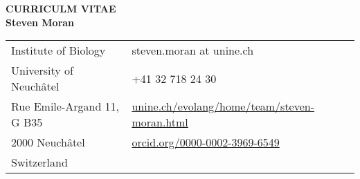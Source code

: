 \documentclass[11pt]{article}
\begin{document}
\pagestyle{empty}


\begin{center}
{\bf CURRICULM VITAE\\Steven Moran}\\

\vskip 12pt

\begin{tabular}{ll}
%


Institute of Biology   & steven.moran at unine.ch \\
University of Neuchâtel & +41 32 718 24 30 \\
Rue Emile-Argand 11, G B35 & \href{https://www.unine.ch/evolang/home/team/steven-moran.html}{unine.ch/evolang/home/team/steven-moran.html} \\
2000 Neuchâtel & \href{https://orcid.org/0000-0002-3969-6549}{orcid.org/0000-0002-3969-6549} \\
Switzerland & \\
\end{tabular}
\end{center}
\end{document}
